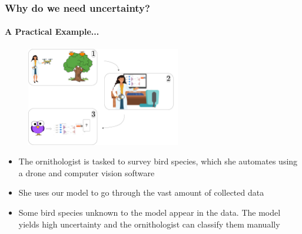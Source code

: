 \documentclass[9pt]{beamer}
\begin{document}
\begin{frame}
\frametitle{Why do we need uncertainty?}
\framesubtitle{A Practical Example...}
	\begin{figure}
		\centering
		\includegraphics[width=0.6\textwidth]{images/ornithology.pdf}
	\end{figure}
	\begin{itemize}\setlength\itemsep{1em}
	\item The ornithologist is tasked to survey bird species, which she automates using a drone and computer vision software
	\item She uses our model to go through the vast amount of collected data
	\item Some bird species unknown to the model appear in the data. The model yields high uncertainty and the ornithologist can classify them manually
	\end{itemize}
\end{frame}
\end{document}
